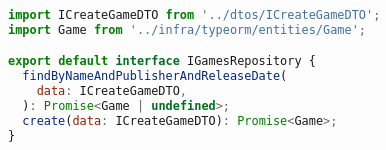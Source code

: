 \begin{lstlisting}[language=JavaScript, caption={IGamesRepository.ts},captionpos=b, label=alg:igamerepository]
import ICreateGameDTO from '../dtos/ICreateGameDTO';
import Game from '../infra/typeorm/entities/Game';

export default interface IGamesRepository {
  findByNameAndPublisherAndReleaseDate(
    data: ICreateGameDTO,
  ): Promise<Game | undefined>;
  create(data: ICreateGameDTO): Promise<Game>;
}
  
\end{lstlisting}
